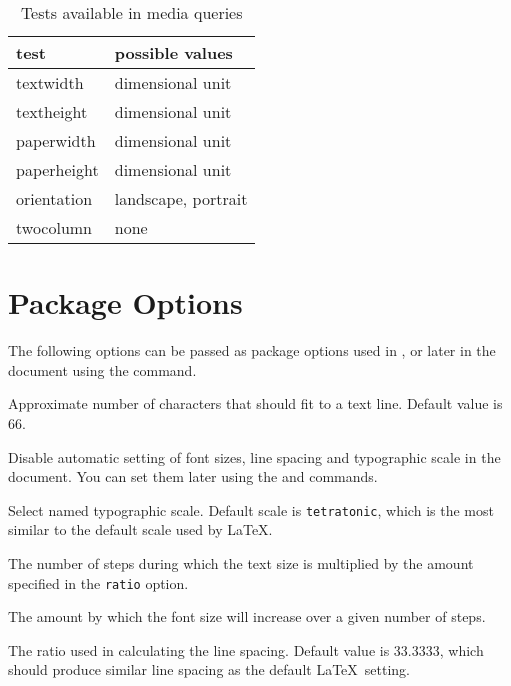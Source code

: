 \documentclass{ltxdoc}
\begin{document}
\begin{table}[htbp]
  \centering
  \begin{tabular}{ll}
    \toprule
    test & possible values \\
    \midrule
    textwidth & dimensional unit \\
    textheight & dimensional unit \\
    paperwidth & dimensional unit\\
    paperheight & dimensional unit\\
    orientation & landscape, portrait\\
    twocolumn & none \\
    \bottomrule
  \end{tabular}
  \caption{Tests available in media queries}\label{tbl:mediaqueries}
\end{table}




\section{Package Options}

The following options can be passed as package options used in \cmd{\usepackage}, 
or later in the document using the \cmd{\ResponsiveSetup} command.

\medskip

\noindent {} Approximate number of characters that should fit to a text line. Default value is 66.

\noindent {}  Disable automatic setting of font sizes, line spacing and typographic scale in the document. You can set them 
later using the \cmd{\setsizes} and \cmd{\ResponsiveSetup} commands.

\noindent {} Select named typographic scale. Default scale is
\texttt{tetratonic}, which is the most similar to the default scale used by
\LaTeX.

\noindent {} The number of steps during which the text size is multiplied by the amount specified in the \texttt{ratio} option.

\noindent {} The amount by which the font size will increase over a given number of steps.

\noindent {} The ratio used in calculating the line spacing. Default value is 33.3333, which should produce similar line spacing as the default \LaTeX\ setting.
\end{document}
